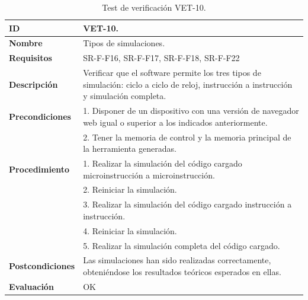 \begin{center}
\begin{table}[htb]
\centering
\caption{Test de verificación VET-10.}
\begin{tabular}{@{}p{2.5cm} p{13cm}@{}} 
\toprule
\textbf{ID} 					& VET-10. \\
\midrule
\textbf{Nombre} 				& Tipos de simulaciones. \\
\midrule
\textbf{Requisitos} 		& SR-F-F16, SR-F-F17, SR-F-F18, SR-F-F22\\
\midrule
\textbf{Descripción} 		& Verificar que el \gls{software} permite los tres tipos de simulación: ciclo a ciclo de reloj, instrucción a instrucción y simulación completa. \\
\midrule
\textbf{Precondiciones}		& 1. Disponer de un dispositivo con una versión de navegador web igual o superior a los indicados anteriormente. \\
											& 2. Tener la memoria de control y la memoria principal de la herramienta generadas. \\
\midrule
\textbf{Procedimiento}		& 1. Realizar la simulación del código cargado microinstrucción a microinstrucción.\\
											& 2. Reiniciar la simulación.\\
											& 3. Realizar la simulación del código cargado instrucción a instrucción.\\
											& 4. Reiniciar la simulación.\\
											& 5. Realizar la simulación completa del código cargado. \\
\midrule
\textbf{Postcondiciones} 		&  Las simulaciones han sido realizadas correctamente, obteniéndose los resultados teóricos esperados en ellas.\\
\midrule
\textbf{Evaluación} 			& OK \\
\bottomrule
\end{tabular}
\label{tab:vet10}
\end{table}
\end{center}

